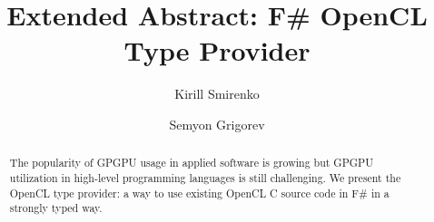 \documentclass[sigplan]{acmart}\settopmatter{}
\begin{document}
\title[]{Extended Abstract: F\# OpenCL Type Provider}         %



\author{Kirill Smirenko}


\author{Semyon Grigorev}


\begin{abstract}
The popularity of GPGPU usage in applied software is growing but GPGPU utilization in high-level programming languages is still challenging.
We present the OpenCL type provider: a way to use existing OpenCL C source code in F\# in a strongly typed way. 
\end{abstract}
\end{document}
